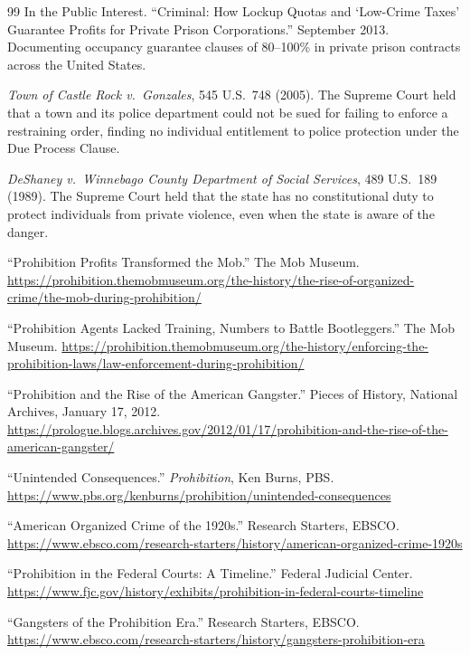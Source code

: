 \documentclass[12pt,openany]{book}
\begin{document}
\begin{thebibliography}{99}
In the Public Interest. ``Criminal: How Lockup Quotas and `Low-Crime Taxes' Guarantee Profits for Private Prison Corporations.'' September 2013. Documenting occupancy guarantee clauses of 80--100\% in private prison contracts across the United States.

\textit{Town of Castle Rock v.\ Gonzales}, 545 U.S.~748 (2005). The Supreme Court held that a town and its police department could not be sued for failing to enforce a restraining order, finding no individual entitlement to police protection under the Due Process Clause.

\textit{DeShaney v.\ Winnebago County Department of Social Services}, 489 U.S.~189 (1989). The Supreme Court held that the state has no constitutional duty to protect individuals from private violence, even when the state is aware of the danger.


``Prohibition Profits Transformed the Mob.'' The Mob Museum. \url{https://prohibition.themobmuseum.org/the-history/the-rise-of-organized-crime/the-mob-during-prohibition/}

``Prohibition Agents Lacked Training, Numbers to Battle Bootleggers.'' The Mob Museum. \url{https://prohibition.themobmuseum.org/the-history/enforcing-the-prohibition-laws/law-enforcement-during-prohibition/}

``Prohibition and the Rise of the American Gangster.'' Pieces of History, National Archives, January 17, 2012. \url{https://prologue.blogs.archives.gov/2012/01/17/prohibition-and-the-rise-of-the-american-gangster/}

``Unintended Consequences.'' \textit{Prohibition}, Ken Burns, PBS. \url{https://www.pbs.org/kenburns/prohibition/unintended-consequences}

``American Organized Crime of the 1920s.'' Research Starters, EBSCO. \url{https://www.ebsco.com/research-starters/history/american-organized-crime-1920s}

``Prohibition in the Federal Courts: A Timeline.'' Federal Judicial Center. \url{https://www.fjc.gov/history/exhibits/prohibition-in-federal-courts-timeline}

``Gangsters of the Prohibition Era.'' Research Starters, EBSCO. \url{https://www.ebsco.com/research-starters/history/gangsters-prohibition-era}


\end{thebibliography}
\end{document}

